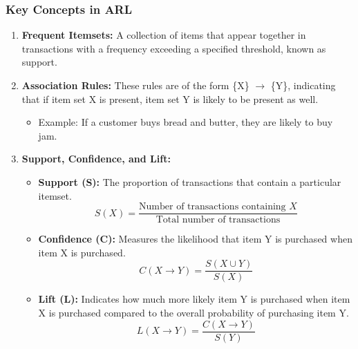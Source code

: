 \documentclass[aspectratio=169]{beamer}
\begin{document}
\begin{frame}[fragile]
    \frametitle{Key Concepts in ARL}
    \begin{enumerate}
        \item \textbf{Frequent Itemsets:} 
        A collection of items that appear together in transactions with a frequency exceeding a specified threshold, known as support.
        
        \item \textbf{Association Rules:} 
        These rules are of the form \{X\} $\rightarrow$ \{Y\}, indicating that if item set X is present, item set Y is likely to be present as well.
        \begin{itemize}
            \item Example: If a customer buys bread and butter, they are likely to buy jam.
        \end{itemize}
        
        \item \textbf{Support, Confidence, and Lift:} 
        \begin{itemize}
            \item \textbf{Support (S):} The proportion of transactions that contain a particular itemset.
            \begin{equation}
                S(X) = \frac{\text{Number of transactions containing } X}{\text{Total number of transactions}}
            \end{equation}
            
            \item \textbf{Confidence (C):} Measures the likelihood that item Y is purchased when item X is purchased.
            \begin{equation}
                C(X \rightarrow Y) = \frac{S(X \cup Y)}{S(X)}
            \end{equation}
            
            \item \textbf{Lift (L):} Indicates how much more likely item Y is purchased when item X is purchased compared to the overall probability of purchasing item Y.
            \begin{equation}
                L(X \rightarrow Y) = \frac{C(X \rightarrow Y)}{S(Y)}
            \end{equation}
        \end{itemize}
    \end{enumerate}
\end{frame}
\end{document}
